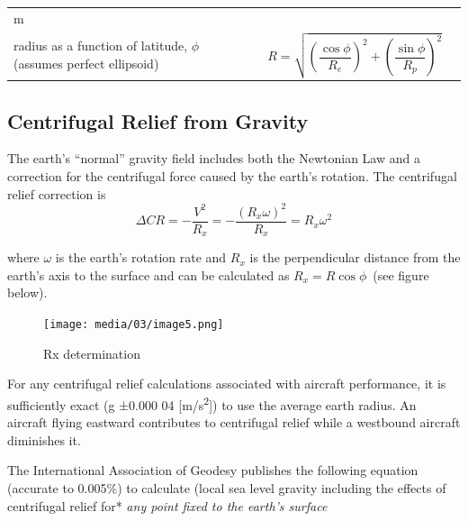 \documentclass[
]{book}
\begin{document}
\begin{longtable}[]{@{}llll@{}}
\begin{minipage}[t]{0.05\columnwidth}
m\strut
\end{minipage}\tabularnewline
\begin{minipage}[t]{0.34\columnwidth}\raggedright
radius as a function of latitude, \(\phi\) (assumes perfect ellipsoid)\strut
\end{minipage} & \begin{minipage}[t]{0.06\columnwidth}\raggedright
\strut
\end{minipage} & \begin{minipage}[t]{0.44\columnwidth}\raggedright
\[R = \sqrt{\left(\frac{\cos{\phi}}{R_e}\right)^2 + \left(\frac{\sin{\phi}}{R_p}\right)^2} \]\strut
\end{minipage} & \begin{minipage}[t]{0.05\columnwidth}\raggedright
\strut
\end{minipage}\tabularnewline
\bottomrule
\end{longtable}

\hypertarget{centrifugal-relief-from-gravity}{%
\subsection*{Centrifugal Relief from Gravity}\label{centrifugal-relief-from-gravity}}

The earth's ``normal'' gravity field includes both the Newtonian Law and a correction for the centrifugal force caused by the earth's rotation. The centrifugal relief correction is
\[
\Delta C R = -\frac{V^2}{R_x} = -\frac{\left( R_x \omega \right)^2}{R_x} = R_x \omega^2
\]

where \(\omega\) is the earth's rotation rate and \(R_x\) is the perpendicular distance from the earth's axis to the surface and can be calculated as \(R_x =R \cos{\phi}\)~(see figure below).

\begin{figure}
\centering
\texttt{[image: media/03/image5.png]}
\caption{Rx determination}
\end{figure}

For any centrifugal relief calculations associated with aircraft performance, it is sufficiently exact (g ±0.000 04 {[}m/s\textsuperscript{2}{]}) to use the average earth radius. An aircraft flying eastward contributes to centrifugal relief while a westbound aircraft diminishes it.

The International Association of Geodesy publishes the following equation (accurate to 0.005\%) to calculate (local sea level gravity including the effects of centrifugal relief for* \emph{any point fixed to the earth's surface}
\end{document}
